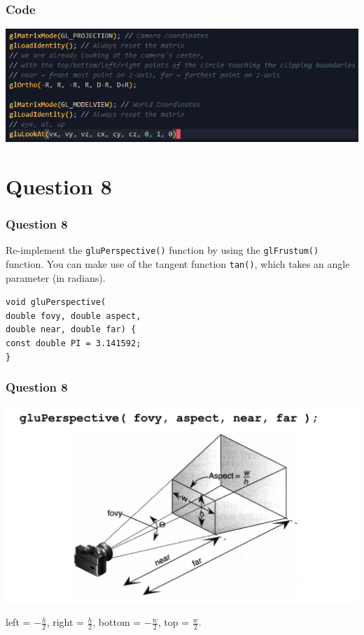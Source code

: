\documentclass{beamer}
\newcommand\tab[1][0.3cm]{\hspace*{#1}}
\begin{document}
\begin{frame}
    \frametitle{Code}
    
    \begin{center}
        \includegraphics[scale=0.8]{q7-ans.png}
    \end{center}

\end{frame}

\section{Question 8}

\begin{frame}
    \frametitle{Question 8}
    Re-implement the \texttt{gluPerspective()} function by using the 
    \texttt{glFrustum()} function. You can make use of the tangent function 
    \texttt{tan()}, which takes an angle parameter (in radians). 

    \begin{tcolorbox}
        \small
        \texttt{void gluPerspective(\\
            \tab \tab double fovy, double aspect, \\
            \tab \tab double near, double far) \{ \\
            \tab const double PI = 3.141592;\\
        \}}
    \end{tcolorbox}
\end{frame}

\begin{frame}
    \frametitle{Question 8}

    \begin{center}
        \includegraphics[scale=0.3]{gluPerspective.png}
    \end{center}

    left = $-\frac{h}{2}$, right = $\frac{h}{2}$, bottom = $-\frac{w}{2}$, top = $\frac{w}{2}$.\\

\end{frame}
\end{document}

